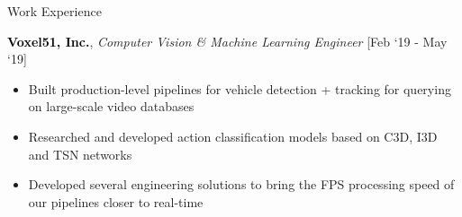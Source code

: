 \documentclass{resume} %
\begin{document}
\begin{rSection}{Work Experience}
\vspace*{8pt}

\textcolor{Black}{\textbf{Voxel51, Inc.}}, \textit{Computer Vision \& Machine Learning Engineer}  \hfill[Feb `19 - May `19]\\
\vspace{-13pt}
\begin{itemize}[leftmargin=*]
    \setlength\itemsep{-2pt}
    \item Built production-level pipelines for vehicle detection + tracking for querying on large-scale video databases
    \item Researched and developed action classification models based on C3D, I3D and TSN networks
    \item Developed several engineering solutions to bring the FPS processing speed of our pipelines closer to real-time 
\end{itemize}
\end{rSection}

\vspace*{-8pt}
\end{document}
